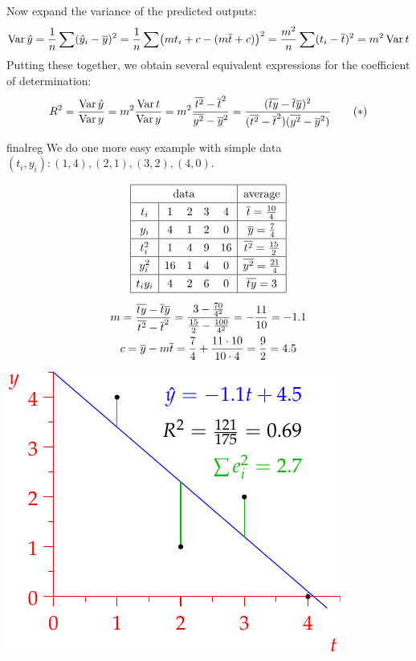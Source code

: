 \goodbreak

Now expand the variance of the predicted outputs:
\[
	\operatorname{Var}\hat y=\frac 1n\sum(\hat y_i-\overline{y})^2=\frac 1n\sum\bigl(mt_i+c-(m\overline{t}+c)\bigr)^2 =\frac{m^2}n\sum(t_i-\overline{t})^2=m^2\operatorname{Var} t
\]
Putting these together, we obtain several equivalent expressions for the coefficient of determination:\label{pg:rsqalt}
\[
	R^2 =\frac{\operatorname{Var}\hat y}{\operatorname{Var} y} 
	=m^2\frac{\operatorname{Var} t}{\operatorname{Var} y} 
	=m^2\frac{\overline{t^2}-\overline{t}^2}{\overline{y^2}-\overline{y}^2}
	=\frac{(\overline{ty}-\overline{t}\overline{y})^2}{(\overline{t^2}-\overline{t}^2)(\overline{y^2}-\overline{y}^2)}
\tag{$\ast$}
\]

\begin{example}{}{finalreg}
	We do one more easy example with simple data $(t_i,y_i):(1,4),(2,1),(3,2),(4,0)$.\par
	\begin{minipage}[t]{0.55\linewidth}\vspace{-10pt}
		\begin{gather*}\renewcommand{\arraystretch}{1.3}
			\begin{array}{|c|cccc|c|}
				\hline
				\multicolumn{5}{|c|}{\text{data}}&\text{average}\\\hline
				t_i&1&2&3&4&\cl t=\frac{10}4\\\hline
				y_i&4&1&2&0&\cl y=\frac 74\\\hline
				t_i^2&1&4&9&16&\cl{t^2}=\frac{15}2\\\hline
				y_i^2&16&1&4&0&\cl{y^2}=\frac{21}4\\\hline
				t_iy_i&4&2&6&0&\cl{ty}=3\\\hline
			\end{array}\\[5pt]
			m=\frac{\cl{ty}-\cl t\cl y}{\cl{t^2}-\cl t^2} =\frac{3-\frac{70}{4^2}}{\frac{15}2-\frac{100}{4^2}} =-\frac{11}{10}=-1.1\\
			c=\cl y-m\cl t=\frac{7}4+\frac{11\cdot 10}{10\cdot 4}=\frac 92 =4.5
		\end{gather*}
\end{minipage}
\hfill
\begin{minipage}[t]{0.44\linewidth}\vspace{0pt}
	\flushright\includegraphics{reg-line5}

\end{minipage}
\end{example}
